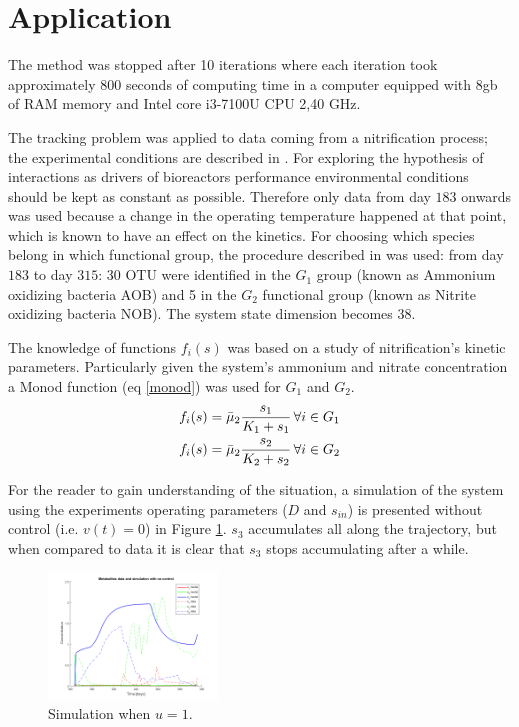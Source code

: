 \documentclass[3p,times]{elsarticle}
\begin{document}
\clearpage
\section{Application}
 
The method was stopped after 10 iterations where each iteration took approximately 800 seconds of computing time in a computer equipped with 8gb of RAM memory and Intel core i3-7100U CPU 2,40 GHz.

The tracking problem was applied to data coming from a nitrification process; the experimental conditions are described in \cite{dumont2008observers}. For exploring the hypothesis of interactions as drivers of bioreactors performance environmental conditions should be kept as constant as possible. Therefore only data from day $183$ onwards was used because a change in the operating temperature happened at that point, which is known to have an effect on the kinetics. For choosing which species belong in which functional group, the procedure described in \cite{Ugalde-Salas2019} was used: from day $183$ to day $315$: 30 OTU were identified in the $G_1$ group (known as Ammonium oxidizing bacteria AOB) and 5 in the $G_2$ functional group (known as Nitrite oxidizing bacteria NOB). The system state dimension becomes 38.

The knowledge of functions $f_i(s)$ was based on a study of nitrification's kinetic parameters\cite{Wiesmann1994}. Particularly given the system's ammonium and nitrate concentration a Monod function (eq \eqref{monod}) was used for $G_1$ and $G_2$. 
\begin{align}
\label{monod} f_i(s) &= \bar{\mu}_2 \dfrac{s_1}{K_1 +s_1} \, \forall i \in G_1 \\
\notag  f_i(s) &= \bar{\mu}_2 \dfrac{s_2}{K_2 +s_2 } \, \forall i \in G_2
\end{align}

For the reader to gain understanding of the situation, a simulation of the system using the experiments operating parameters ($D$ and $s_{in}$) is presented without control (i.e. $v(t)= 0$) in  Figure \ref{NoControlSimulation}. $s_3$ accumulates all along the trajectory, but when compared to data it is clear that $s_3$ stops accumulating after a while. 

\begin{figure}[h]
	\centering
	\includegraphics[width= 0.4\textwidth]{Prediction_No_Control_metabolites}
	\caption{Simulation when $u=1$. }
	\label{NoControlSimulation}
\end{figure}
\end{document}

